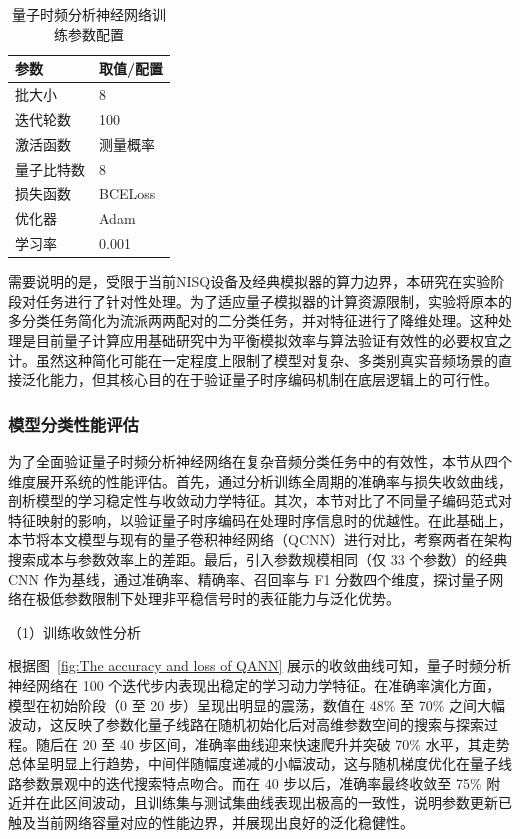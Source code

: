 \begin{table}[!htb]
	\vspace{5pt}
	\renewcommand{\arraystretch}{1.2}
	\setlength{\tabcolsep}{40pt}
	\centering
	\caption{量子时频分析神经网络训练参数配置}
	\label{tab:training_config}
	\begin{tabular}{@{}ll@{}}
		\toprule
		\textbf{参数} & \textbf{取值/配置} \\
		\midrule
		批大小 & 8 \\
		迭代轮数 & 100 \\
		激活函数 & 测量概率 \\
		量子比特数 & 8 \\
		损失函数 & BCELoss \\
		优化器 & Adam \\
		学习率 & 0.001 \\
		\bottomrule
	\end{tabular}
\end{table}

需要说明的是，受限于当前NISQ设备及经典模拟器的算力边界，本研究在实验阶段对任务进行了针对性处理。为了适应量子模拟器的计算资源限制，实验将原本的多分类任务简化为流派两两配对的二分类任务，并对特征进行了降维处理。这种处理是目前量子计算应用基础研究中为平衡模拟效率与算法验证有效性的必要权宜之计。虽然这种简化可能在一定程度上限制了模型对复杂、多类别真实音频场景的直接泛化能力，但其核心目的在于验证量子时序编码机制在底层逻辑上的可行性。


\subsubsection{模型分类性能评估}
\label{subsec:performance_analysis}

为了全面验证量子时频分析神经网络在复杂音频分类任务中的有效性，本节从四个维度展开系统的性能评估。首先，通过分析训练全周期的准确率与损失收敛曲线，剖析模型的学习稳定性与收敛动力学特征。其次，本节对比了不同量子编码范式对特征映射的影响，以验证量子时序编码在处理时序信息时的优越性。在此基础上，本节将本文模型与现有的量子卷积神经网络（QCNN）进行对比，考察两者在架构搜索成本与参数效率上的差距。最后，引入参数规模相同（仅 33 个参数）的经典 CNN 作为基线，通过准确率、精确率、召回率与 F1 分数四个维度，探讨量子网络在极低参数限制下处理非平稳信号时的表征能力与泛化优势。

（1）训练收敛性分析

根据图~\ref{fig:The accuracy and loss of QANN} 展示的收敛曲线可知，量子时频分析神经网络在 100 个迭代步内表现出稳定的学习动力学特征。在准确率演化方面，模型在初始阶段（0 至 20 步）呈现出明显的震荡，数值在 48\% 至 70\% 之间大幅波动，这反映了参数化量子线路在随机初始化后对高维参数空间的搜索与探索过程。随后在 20 至 40 步区间，准确率曲线迎来快速爬升并突破 70\% 水平，其走势总体呈明显上行趋势，中间伴随幅度递减的小幅波动，这与随机梯度优化在量子线路参数景观中的迭代搜索特点吻合。而在 40 步以后，准确率最终收敛至 75\% 附近并在此区间波动，且训练集与测试集曲线表现出极高的一致性，说明参数更新已触及当前网络容量对应的性能边界，并展现出良好的泛化稳健性。

